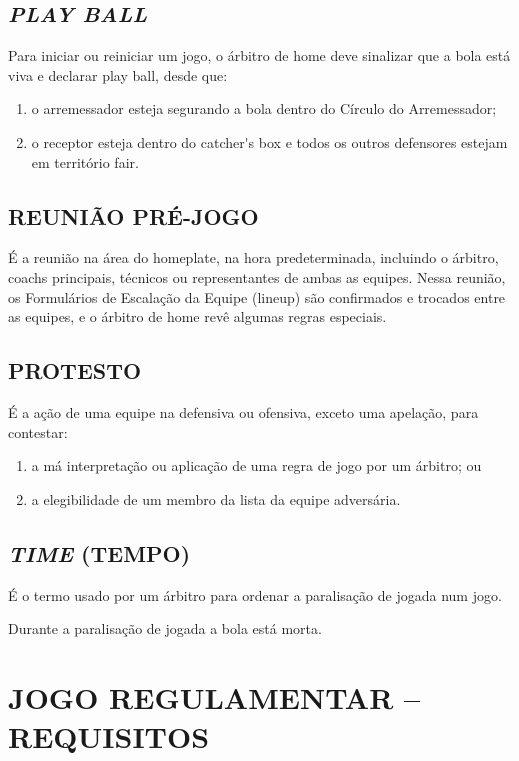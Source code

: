 \subsection{\textit{PLAY BALL}}
 Para iniciar ou reiniciar um jogo, o árbitro de \gls{home} deve sinalizar que a bola
 está viva e declarar \gls{play ball}, desde que:
	 \begin{enumerate}[label=(\alph*)]
		\item  o arremessador esteja segurando a bola dentro do Círculo do Arremessador;
		\item  o receptor esteja dentro do \gls{catcher's box} e todos os outros  defensores estejam em território \gls{fair}.
	\end{enumerate}

\subsection{REUNIÃO PRÉ-JOGO}

É a reunião na área do \gls{homeplate}, na hora predeterminada, incluindo o árbitro, \glspl{coach} principais, técnicos ou representantes de ambas as equipes. Nessa  reunião, os Formulários de Escalação da Equipe (\gls{lineup}) são confirmados e trocados entre as equipes, e o árbitro de \gls{home} revê algumas regras especiais.

\subsection{PROTESTO}

É a ação de uma equipe na defensiva ou ofensiva, exceto uma apelação, para  contestar:

\begin{enumerate}[label=(\alph*)]
\item  a má interpretação ou aplicação de uma regra de jogo por um árbitro; ou
\item  a elegibilidade de um membro da lista da equipe adversária.
\end{enumerate}

\subsection{\textit{TIME} (TEMPO)}
 É o termo usado por um árbitro para ordenar a paralisação de jogada num jogo.

 Durante a paralisação de jogada a bola está morta.

\section{JOGO REGULAMENTAR -- REQUISITOS}
